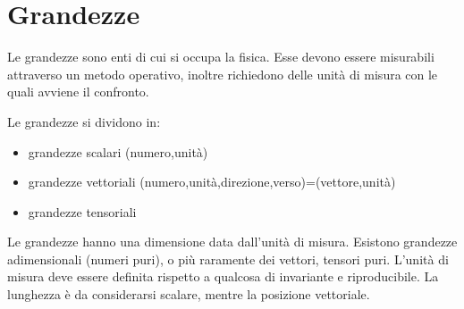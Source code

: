 \section{Grandezze}
Le grandezze sono enti di cui si occupa la fisica. Esse devono essere misurabili attraverso un metodo operativo, inoltre richiedono delle unità di misura con le quali avviene il confronto.
\newline\par
Le grandezze si dividono in:
\begin{itemize}
  \item{}grandezze scalari (numero,unità)
  \item{}grandezze vettoriali
  (numero,unità,direzione,verso)=(vettore,unità)
  \item{}grandezze tensoriali
\end{itemize}
Le grandezze hanno una dimensione data dall'unità di misura. Esistono grandezze adimensionali (numeri puri), o più raramente dei vettori, tensori puri. L'unità di misura deve essere definita rispetto a qualcosa di invariante e riproducibile. La lunghezza è da considerarsi scalare, mentre la posizione vettoriale.


